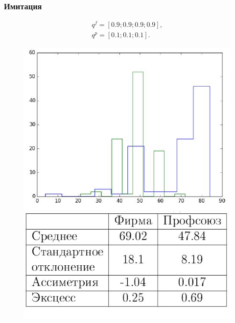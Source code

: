\documentclass {beamer}
\begin{document}
\begin{frame}
	\frametitle{Имитация}
	 \begin{gather*}
	 q^f = \left[ 0.9; 0.9; 0.9; 0.9 \right], \\
	 q^p = \left[ 0.1; 0.1; 0.1 \right].
	 \end{gather*}
		\begin{figure}
			\begin{minipage}[b]{0.45\textwidth}
				
				\includegraphics[width=\textwidth]{firm1}
			\end{minipage}
			\begin{minipage}[b]{0.45\textwidth}
				
				\includegraphics[width=\textwidth]{firmtable1}
			\end{minipage}
			
		\end{figure}
\end{frame}
\end{document}
